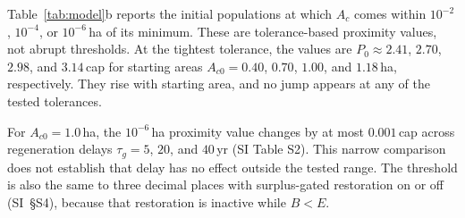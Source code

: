 \documentclass[preprint,12pt,authoryear]{elsarticle}
\begin{document}
Table~\ref{tab:model}b reports the initial populations at which $A_c$ comes within $10^{-2}$, $10^{-4}$, or $10^{-6}$\,ha of its minimum. These are tolerance-based proximity values, not abrupt thresholds. At the tightest tolerance, the values are $P_0\approx2.41$, $2.70$, $2.98$, and $3.14$\,cap for starting areas $A_{c0}=0.40$, $0.70$, $1.00$, and $1.18$\,ha, respectively. They rise with starting area, and no jump appears at any of the tested tolerances.

For $A_{c0}=1.0$\,ha, the $10^{-6}$\,ha proximity value changes by at most $0.001$\,cap across regeneration delays $\tau_g=5$, $20$, and $40$\,yr (SI Table S2). This narrow comparison does not establish that delay has no effect outside the tested range. The threshold is also the same to three decimal places with surplus-gated restoration on or off (SI~\S S4), because that restoration is inactive while $B<E$.
\end{document}
